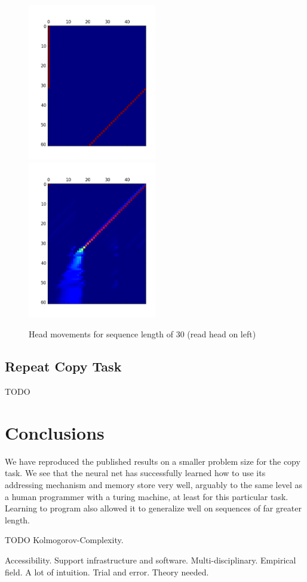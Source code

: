 \documentclass[12pt]{article}
\begin{document}
\begin{figure}[h]
\includegraphics[width=0.5\textwidth]{read_head}
\includegraphics[width=0.5\textwidth]{write_head}
\caption{Head movements for sequence length of 30 (read head on left)}
\end{figure}

\subsection{Repeat Copy Task}

TODO

\section{Conclusions}\label{conclusions}

We have reproduced the published results on a smaller problem size for the
copy task. We see that the neural net has successfully learned how to
use its addressing mechanism and memory store very well, arguably to the
same level as a human programmer with a turing machine, at least for this
particular task. Learning to program also allowed it to generalize
well on sequences of far greater length.

TODO Kolmogorov-Complexity.

Accessibility. Support infrastructure and software. Multi-disciplinary.
Empirical field. A lot of intuition. Trial and error. Theory needed.



\end{document}
